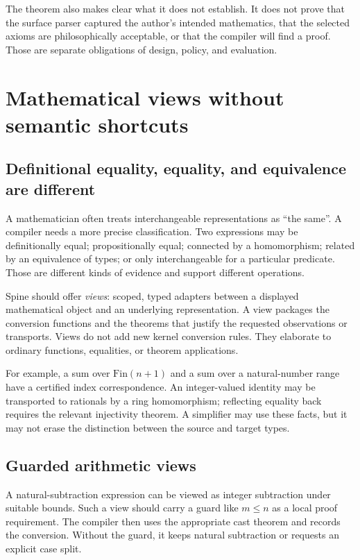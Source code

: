 \documentclass[11pt,letterpaper]{article}
\theoremstyle{definition}
\theoremstyle{remark}
\newcommand{\Spine}{Spine}
\begin{document}
The theorem also makes clear what it does not establish. It does not prove that the surface parser captured the author's intended mathematics, that the selected axioms are philosophically acceptable, or that the compiler will find a proof. Those are separate obligations of design, policy, and evaluation.

\section{Mathematical views without semantic shortcuts}
\label{sec:views}
\subsection{Definitional equality, equality, and equivalence are different}
A mathematician often treats interchangeable representations as ``the same''. A compiler needs a more precise classification. Two expressions may be definitionally equal; propositionally equal; connected by a homomorphism; related by an equivalence of types; or only interchangeable for a particular predicate. Those are different kinds of evidence and support different operations.

\Spine{} should offer \emph{views}: scoped, typed adapters between a displayed mathematical object and an underlying representation. A view packages the conversion functions and the theorems that justify the requested observations or transports. Views do not add new kernel conversion rules. They elaborate to ordinary functions, equalities, or theorem applications.

For example, a sum over $\mathrm{Fin}(n+1)$ and a sum over a natural-number range have a certified index correspondence. An integer-valued identity may be transported to rationals by a ring homomorphism; reflecting equality back requires the relevant injectivity theorem. A simplifier may use these facts, but it may not erase the distinction between the source and target types.

\subsection{Guarded arithmetic views}
A natural-subtraction expression can be viewed as integer subtraction under suitable bounds. Such a view should carry a guard like $m\le n$ as a local proof requirement. The compiler then uses the appropriate cast theorem and records the conversion. Without the guard, it keeps natural subtraction or requests an explicit case split.
\end{document}
